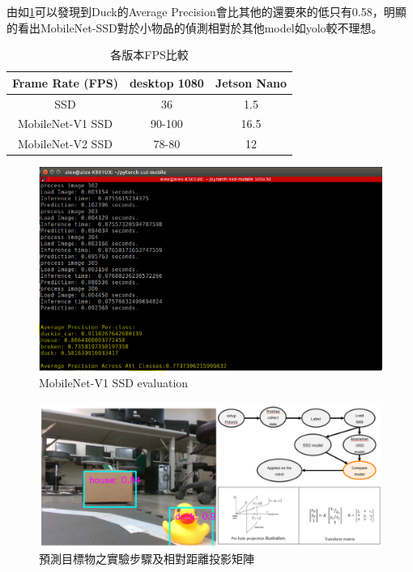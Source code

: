 由如\ref{figure:evaluation}可以發現到Duck的Average Precision會比其他的還要來的低只有0.58，明顯的看出MobileNet-SSD對於小物品的偵測相對於其他model如yolo較不理想。


\begin{table}[h]
	\centering
	\begin{tabular}{| c| c| c|}
		\hline
		Frame Rate (FPS) & desktop 1080 & Jetson Nano \\ 
		\hline
		SSD & 36 & 1.5 \\ 
		\hline
		MobileNet-V1 SSD  & 90-100 & 16.5 \\ 
		\hline 
		MobileNet-V2 SSD & 78-80 & 12 \\ 
 
		\hline 
	\end{tabular}
	\caption{各版本FPS比較}
	\label{table:fps_compare}
\end{table} 

\begin{figure}[t]
	\centering
	\includegraphics[height=!,width=\linewidth,keepaspectratio=true]
	{images/evaluation.png}
	\caption{MobileNet-V1 SSD evaluation}
	\label{figure:evaluation}
\end{figure}

\begin{figure}[h]
	\centering
	\includegraphics[height=!,width=\linewidth,keepaspectratio=true]
	{images/vision.png}
	\caption{預測目標物之實驗步驟及相對距離投影矩陣}
	\label{figure:vision}
\end{figure}


